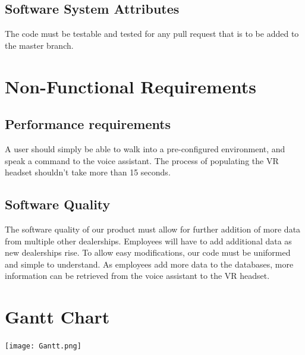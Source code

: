 \documentclass[onecolumn, draftclsnofoot,10pt, compsoc]{IEEEtran}
\begin{document}
    
    \subsection{Software System Attributes}
        The code must be testable and tested for any pull request that is to be added to the master branch.
    

\section{Non-Functional Requirements}

\subsection{Performance requirements}
    A user should simply be able to walk into a pre-configured environment, and speak a command to the voice assistant. The process of populating the VR headset shouldn't take more than 15 seconds. 
\subsection{Software Quality}
   The software quality of our product must allow for further addition of more data from multiple other dealerships. Employees will have to add additional data as new dealerships rise. To allow easy modifications, our code must be uniformed and simple to understand. As employees add more data to the databases, more information can be retrieved from the voice assistant to the VR headset.  

\section{Gantt Chart}
\texttt{[image: Gantt.png]}
\end{document}
